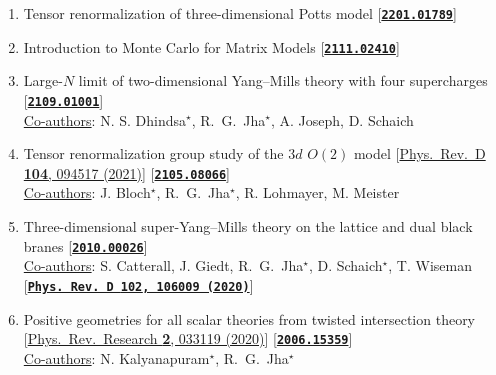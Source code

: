 \documentclass[article]{res}
\begin{document}
\begin{enumerate}

\item  Tensor renormalization of three-dimensional Potts model [\textbf{\texttt{\textcolor{blue}{\href{https://arxiv.org/abs/2201.01789}{2201.01789}}}}]
\vspace{2mm} 

\item Introduction to Monte Carlo for Matrix Models [\textbf{\texttt{\textcolor{blue}{\href{https://arxiv.org/abs/2111.02410}{2111.02410}}}}]
\vspace{2mm} 

\item Large-$N$ limit of two-dimensional Yang--Mills theory with four supercharges [\textbf{\texttt{\textcolor{blue}{\href{https://arxiv.org/abs/2109.01001}{2109.01001}}}}] \\
\underline{Co-authors}: N. S. Dhindsa$^{\star}$, R.~G.~Jha$^{\star}$, A. Joseph, D. Schaich 
 \vspace{2mm} 

\item Tensor renormalization group study of the $3d$ $O(2)$ model [\href{https://journals.aps.org/prd/abstract/10.1103/PhysRevD.104.094517}{Phys.\ Rev.\ D {\bf 104}, 094517 (2021)}]  [\textbf{\texttt{\textcolor{blue}{\href{https://arxiv.org/abs/2105.08066}{2105.08066}}}}] \\
\underline{Co-authors}: J. Bloch$^{\star}$, R.~G.~Jha$^{\star}$, R. Lohmayer, M. Meister
 \vspace{2mm} 

 \item Three-dimensional super-Yang--Mills theory on the lattice and dual black branes  [\textbf{\texttt{\textcolor{blue}{\href{https://arxiv.org/abs/2010.00026}{2010.00026}}}}] \\
\underline{Co-authors}: S. Catterall, J. Giedt, R.~G.~Jha$^{\star}$, D. Schaich$^{\star}$, T. Wiseman  [\textbf{\texttt{\textcolor{blue}{\href{https://journals.aps.org/prd/abstract/10.1103/PhysRevD.102.106009}{Phys.\ Rev.\ D {\bf 102}, 106009 (2020)}}}}] 
 \vspace{2mm} 
 
 \item Positive geometries for all scalar theories from twisted intersection theory [\href{https://journals.aps.org/prresearch/abstract/10.1103/PhysRevResearch.2.033119}{Phys.\ Rev.\ Research {\bf 2}, 033119 (2020)}] [\texttt{\textbf{\textcolor{blue}{\href{https://arxiv.org/abs/2006.15359}{2006.15359}}}}] \\ 
\underline{Co-authors}: N. Kalyanapuram$^{\star}$, R.~G.~Jha$^{\star}$
 \vspace{2mm} 
 

\end{enumerate}
\end{document}
